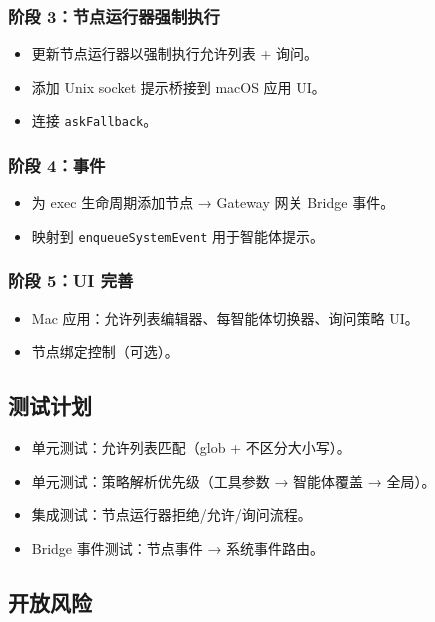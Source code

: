 \subsubsection{阶段 3：节点运行器强制执行}


\begin{itemize}
  \item 更新节点运行器以强制执行允许列表 + 询问。
  \item 添加 Unix socket 提示桥接到 macOS 应用 UI。
  \item 连接 \texttt{askFallback}。
\end{itemize}


\subsubsection{阶段 4：事件}


\begin{itemize}
  \item 为 exec 生命周期添加节点 → Gateway 网关 Bridge 事件。
  \item 映射到 \texttt{enqueueSystemEvent} 用于智能体提示。
\end{itemize}


\subsubsection{阶段 5：UI 完善}


\begin{itemize}
  \item Mac 应用：允许列表编辑器、每智能体切换器、询问策略 UI。
  \item 节点绑定控制（可选）。
\end{itemize}


\subsection{测试计划}


\begin{itemize}
  \item 单元测试：允许列表匹配（glob + 不区分大小写）。
  \item 单元测试：策略解析优先级（工具参数 → 智能体覆盖 → 全局）。
  \item 集成测试：节点运行器拒绝/允许/询问流程。
  \item Bridge 事件测试：节点事件 → 系统事件路由。
\end{itemize}


\subsection{开放风险}


